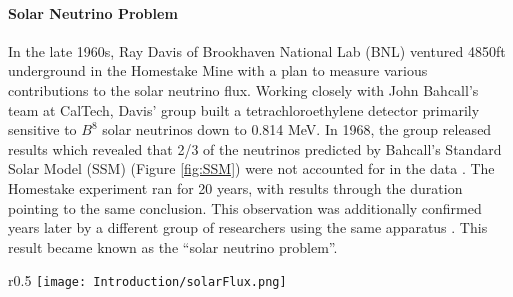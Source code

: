 \paragraph {Solar Neutrino Problem} In the late 1960s, Ray Davis of Brookhaven National Lab (BNL) ventured 4850ft underground in the Homestake Mine with a plan to measure various contributions to the solar neutrino flux. Working closely with John Bahcall's team at CalTech, Davis' group built a tetrachloroethylene detector primarily sensitive to $B^8$ solar neutrinos down to 0.814 MeV. In 1968, the group released results which revealed that 2/3 of the neutrinos predicted by Bahcall's Standard Solar Model (SSM) (Figure \ref{fig:SSM}) were not accounted for in the data \cite{bib:ray0}. The Homestake experiment ran for 20 years, with results through the duration pointing to the same conclusion. This observation was additionally confirmed years later by a different group of researchers using the same apparatus \cite{bib:rayreview}.  This result became known as the ``solar neutrino problem''.

\begin{wrapfigure}{r}{0.5\textwidth}
\texttt{[image: Introduction/solarFlux.png]}
\caption{John Bahcall's Standard Solar Flux Model}
\label{fig:SSM}
\end{wrapfigure}

